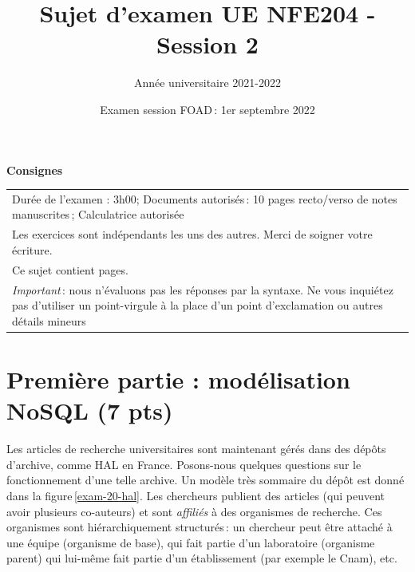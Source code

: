 \documentclass[11pt,a4paper]{article}
\begin{document}
\title{Sujet d'examen UE NFE204 - Session 2}
\author{Année universitaire 2021-2022}
\date{Examen session FOAD\,: 1er septembre  2022}

\maketitle

\begin{center}
{\bf \Large Consignes}\\
\begin{tabular}{| p{15cm} |}
\hline
Dur\'ee de l'examen : 3h00; Documents autoris\'es\,: 10 pages recto/verso de
notes manuscrites\,;  Calculatrice autoris\'ee\\

Les exercices sont indépendants les uns des autres. Merci de soigner votre écriture.\\
Ce sujet contient \pageref{LastPage} pages.\\

\textit{Important}\,: nous n'évaluons pas les réponses par la syntaxe. Ne vous
inquiétez pas d'utiliser un point-virgule à la place d'un point d'exclamation ou
autres détails mineurs
\\
\hline
\end{tabular}
\end{center}



\section*{Première partie : modélisation NoSQL (7 pts)}

Les articles de recherche universitaires sont maintenant gérés dans des dépôts
d'archive, comme HAL en France. Posons-nous quelques questions sur le fonctionnement
d'une telle archive.
Un modèle très sommaire du dépôt est donné dans la figure\,\ref{exam-20-hal}. Les chercheurs
publient des articles (qui peuvent avoir plusieurs co-auteurs) et sont \emph{affiliés} à des organismes
de recherche. Ces organismes sont hiérarchiquement structurés\,: un chercheur peut être
attaché à une équipe (organisme de base), qui fait partie d'un laboratoire (organisme
parent) qui lui-même fait partie d'un établissement (par exemple le Cnam), etc.
\end{document}

